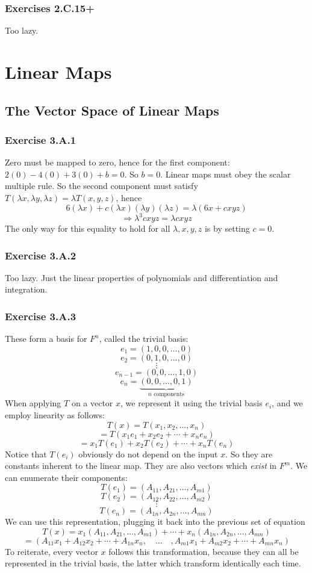 \documentclass{book}
\begin{document}
\subsection*{Exercises 2.C.15+}
Too lazy.

\chapter{Linear Maps}

\section{The Vector Space of Linear Maps}

\subsection*{Exercise 3.A.1}
Zero must be mapped to zero, hence for the first component: $2(0) - 4(0) + 3(0) + b = 0$. So $b = 0$. Linear maps must obey the scalar multiple rule. So the second component must satisfy $T(\lambda x, \lambda y, \lambda z) = \lambda T(x, y, z)$, hence
$$6(\lambda x) + c(\lambda x)(\lambda y)(\lambda z) = \lambda (6x + cxyz)$$
$$\Rightarrow \lambda^3 cxyz = \lambda cxyz$$
The only way for this equality to hold for all $\lambda, x, y, z$ is by setting $c = 0$.

\subsection*{Exercise 3.A.2}
Too lazy. Just the linear properties of polynomials and differentiation and integration.

\subsection*{Exercise 3.A.3}
These form a basis for $F^n$, called the trivial basis:
$$e_1 = (1, 0, 0, \ldots, 0)$$
$$e_2 = (0, 1, 0, \ldots, 0)$$
$$\vdots$$
$$e_{n - 1} = (0, 0, \ldots, 1, 0)$$
$$e_n = \underbrace{(0, 0, \ldots, 0, 1)}_{n \text{ components}}$$
When applying $T$ on a vector $x$, we represent it using the trivial basis $e_i$, and we employ linearity as follows:
$$T(x) = T(x_1, x_2, \ldots, x_n)$$
$$= T(x_1 e_1 + x_2 e_2 + \cdots + x_n e_n)$$
$$= x_1 T(e_1) + x_2 T(e_2) + \cdots + x_n T(e_n)$$
Notice that $T(e_i)$ obviously do not depend on the input $x$. So they are constants inherent to the linear map. They are also vectors which \textit{exist} in $F^m$. We can enumerate their components:
$$T(e_1) = (A_{11}, A_{21}, \ldots, A_{m1})$$
$$T(e_2) = (A_{12}, A_{22}, \ldots, A_{m2})$$
$$\vdots$$
$$T(e_n) = (A_{1n}, A_{2n}, \ldots, A_{mn})$$
We can use this representation, plugging it back into the previous set of equation
$$T(x) = x_1 (A_{11}, A_{21}, \ldots, A_{m1}) + \cdots + x_n (A_{1n}, A_{2n}, \ldots, A_{mn})$$
$$= (A_{11} x_1 + A_{12} x_2 + \cdots + A_{1n} x_n, \quad \ldots \quad, A_{m1} x_1 + A_{m2} x_2 + \cdots + A_{mn} x_n)$$
To reiterate, every vector $x$ follows this transformation, because they can all be represented in the trivial basis, the latter which transform identically each time.
\end{document}
